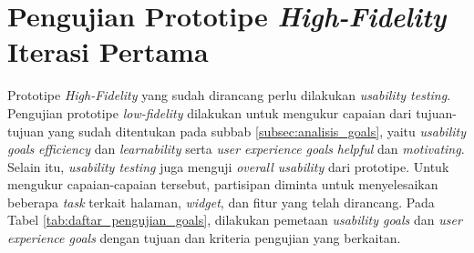 \section{Pengujian Prototipe \textit{High-Fidelity} Iterasi Pertama}
\label{sec:test_1}

Prototipe \textit{High-Fidelity} yang sudah dirancang perlu dilakukan \textit{usability testing}. Pengujian prototipe \textit{low-fidelity} dilakukan untuk mengukur capaian dari tujuan-tujuan yang sudah ditentukan pada subbab \ref{subsec:analisis_goals}, yaitu \textit{usability goals} \textit{efficiency} dan \textit{learnability} serta \textit{user experience goals} \textit{helpful} dan \textit{motivating}. Selain itu, \textit{usability testing} juga menguji \textit{overall usability} dari prototipe. Untuk mengukur capaian-capaian tersebut, partisipan diminta untuk menyelesaikan beberapa \textit{task} terkait halaman, \textit{widget}, dan fitur yang telah dirancang. Pada Tabel \ref{tab:daftar_pengujian_goals}, dilakukan pemetaan \textit{usability goals} dan \textit{user experience goals} dengan tujuan dan kriteria pengujian yang berkaitan.

